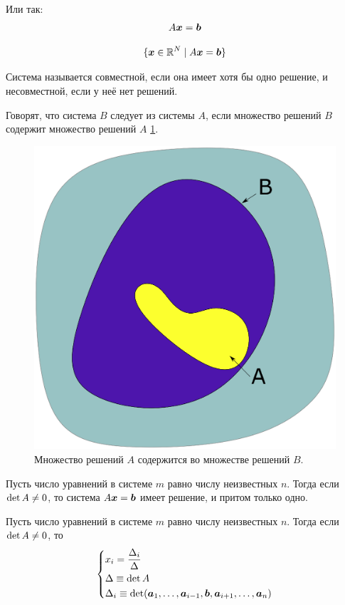 \documentclass[a4paper,12pt]{article}
\begin{document}
  Или так:
  \[
    A \boldsymbol x = \boldsymbol b
  \]
  
  \begin{definition}
    \[
      \{\boldsymbol x \in \operatorname{\mathbb R}^N \mid A \boldsymbol x = \boldsymbol b\}
    \]
  \end{definition}
  
  \begin{definition}
    Система называется совместной, если она имеет хотя бы одно решение, и несовместной, если у неё нет решений.
  \end{definition}
  
  \begin{definition}
    Говорят, что система $B$ следует из системы $A$, если множество решений $B$ содержит множество решений $A$ \ref{fig:a-and-b-sets}.
  \end{definition}
  
  \begin{figure}[h]
    \centering
    
    \includegraphics[width=0.5\columnwidth]{a-and-b-sets}
    
    \caption{Множество решений $A$ содержится во множестве решений $B$.}
    \label{fig:a-and-b-sets}
  \end{figure}
  
  \begin{theorem}
    Пусть число уравнений в системе $m$ равно числу неизвестных $n$.
    Тогда если $\det A \hm{\not=} 0$, то система $A \bds x \hm= \bds b$ имеет решение, и притом только одно.
  \end{theorem}
  
  \begin{theorem}
    Пусть число уравнений в системе $m$ равно числу неизвестных $n$.
    Тогда если $\det A \hm{\not=} 0$, то
    \[
      \left\{
        \begin{aligned}
          &x_i = \frac{\Delta_i}{\Delta}\\
          &\Delta \equiv \det A\\
          &\Delta_i \equiv \det (\boldsymbol a_1, \ldots, \boldsymbol a_{i - 1}, \boldsymbol b, \boldsymbol a_{i + 1}, \ldots, \boldsymbol a_n)
        \end{aligned}
      \right.
    \]
  \end{theorem}
  
\end{document}
